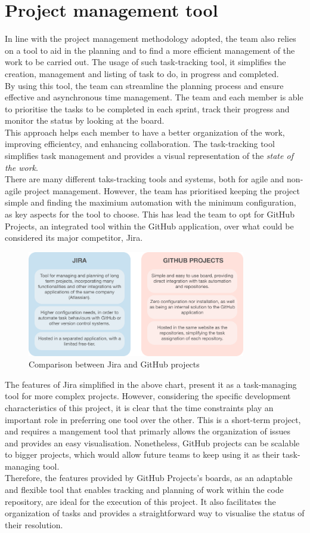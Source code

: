 \documentclass[../memory.tex]{subfiles}
\begin{document}
\section{Project management tool}
In line with the project management methodology adopted, the team also relies on
a tool to aid in the planning and to find a more efficient management of the
work to be carried out. The usage of such task-tracking tool, it simplifies the
creation, management and listing of task to do, in progress and completed.
\\
By using this tool, the team can streamline the planning process and ensure
effective and asynchronous time management. The team and each member is able to
prioritise the tasks to be completed in each sprint, track their progress and
monitor the status by looking at the board.
\\
This approach helps each member to have a better organization of the work,
improving efficientcy, and enhancing collaboration. The task-tracking tool
simplifies task management and provides a visual representation of the
\emph{state of the work}.
\\[8pt]
There are many different taks-tracking tools and systems, both for agile and
non-agile project management. However, the team has prioritised keeping the
project simple and finding the maximium automation with the minimum
configuration, as key aspects for the tool to choose. This has lead the team to
opt for GitHub Projects, an integrated tool within the GitHub application, over
what could be considered its major competitor, Jira.
\begin{figure}[H]
	\centering
	\includegraphics[width=0.85\textwidth]{./assets/jira-vs-github.png}
	\caption{Comparison between Jira and GitHub projects}
\end{figure}
The features of Jira simplified in the above chart, present it as a
task-managing tool for more complex projects. However, considering the specific
development characteristics of this project, it is clear that the time
constraints play an important role in preferring one tool over the other. This
is a short-term project, and requires a mangement tool that primarly allows the
organization of issues and provides an easy visualisation. Nonetheless, GitHub
projects can be scalable to bigger projects, which would allow future teams to
keep using it as their task-managing tool.
\\
Therefore, the features provided by GitHub Projects's boards, as an adaptable
and flexible tool that enables tracking and planning of work within the code
repository, are ideal for the execution of this project. It also facilitates the
organization of tasks and provides a straightforward way to visualise the status
of their resolution.
\end{document}
